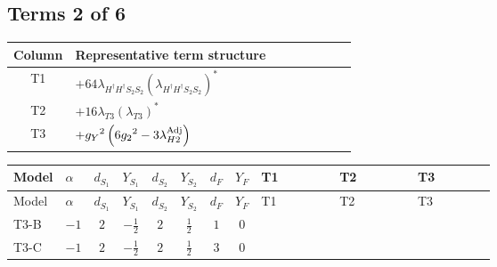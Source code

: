 \documentclass[8pt]{article}
\begin{document}
\begin{landscape}
\subsection*{Terms 2 of 6}
\begin{center}
\begin{tabular}{@{}c >{\raggedright\arraybackslash}p{0.82\linewidth}@{}}
\toprule
Column & Representative term structure \\
\midrule
T1 & \(\displaystyle +64 {\lambda_{H^\dagger H^\dagger S_2 S_2}} \left({\lambda_{H^\dagger H^\dagger S_2 S_2}}\right)^{*}\) \\
\midrule
T2 & \(\displaystyle +16 {\lambda_{T3}} \left({\lambda_{T3}}\right)^{*}\) \\
\midrule
T3 & \(\displaystyle +{g_Y}^2 \left(6 {g_2}^2-3 {\lambda_{H2}^{\rm Adj}}\right)\) \\
\midrule
\bottomrule
\end{tabular}
\end{center}
\smallskip
\tiny
\begin{longtable}{@{}llcccccc >{\raggedright\arraybackslash}p{0.21\linewidth} >{\raggedright\arraybackslash}p{0.21\linewidth} >{\raggedright\arraybackslash}p{0.21\linewidth}@{}}
\toprule
Model & $\alpha$ & $d_{S_1}$ & $Y_{S_1}$ & $d_{S_2}$ & $Y_{S_2}$ & $d_F$ & $Y_F$ & T1 & T2 & T3 \\
\midrule
\endfirsthead
\toprule
Model & $\alpha$ & $d_{S_1}$ & $Y_{S_1}$ & $d_{S_2}$ & $Y_{S_2}$ & $d_F$ & $Y_F$ & T1 & T2 & T3 \\
\midrule
\endhead
T3-B & $-1$ & $2$ & $-\frac{1}{2}$ & $2$ & $\frac{1}{2}$ & $1$ & $0$ & \scriptsize\adjustbox{max width=\linewidth}{$\begin{gathered} +64 {\lambda_{H^\dagger H^\dagger S_2 S_2}} \left({\lambda_{H^\dagger H^\dagger S_2 S_2}}\right)^{*}\end{gathered}$} & \scriptsize\adjustbox{max width=\linewidth}{$\begin{gathered} +16 {\lambda_{T3}} \left({\lambda_{T3}}\right)^{*}\end{gathered}$} & \scriptsize\adjustbox{max width=\linewidth}{$\begin{gathered} +{g_Y}^2 \left(6 {g_2}^2-3 {\lambda_{H2}^{\rm Adj}}\right)\end{gathered}$} \\
\midrule
T3-C & $-1$ & $2$ & $-\frac{1}{2}$ & $2$ & $\frac{1}{2}$ & $3$ & $0$ & \scriptsize\adjustbox{max width=\linewidth}{$\begin{gathered} +64 {\lambda_{H^\dagger H^\dagger S_2 S_2}} \left({\lambda_{H^\dagger H^\dagger S_2 S_2}}\right)^{*}\end{gathered}$} & \scriptsize\adjustbox{max width=\linewidth}{$\begin{gathered} +16 {\lambda_{T3}} \left({\lambda_{T3}}\right)^{*}\end{gathered}$} & \scriptsize\adjustbox{max width=\linewidth}{$\begin{gathered} +{g_Y}^2 \left(6 {g_2}^2-3 {\lambda_{H2}^{\rm Adj}}\right)\end{gathered}$} \\

\end{longtable}
\end{landscape}
\end{document}
